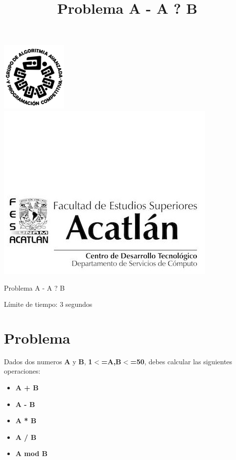 \documentclass[letter,10pt]{article}
\date{}
\begin{document}
\title{Problema A - A ? B}

\includegraphics[scale=0.6]{logo} \hspace*{9.00cm}
\includegraphics[scale=0.5]{dsc} 
\bigskip
\begin{center}
    \Large Problema A - A ? B
\end{center}

\begin{flushright}
Límite de tiempo: 3 segundos
\par\end{flushright}
\bigskip

\section*{Problema}

Dados dos numeros \textbf{A} y \textbf{B}, \textbf{1$<$=A,B$<$=50}, debes calcular las siguientes operaciones:

\begin{itemize}
\item \textbf{A + B}
\item \textbf{A - B}
\item \textbf{A * B}
\item \textbf{A / B}
\item \textbf{A mod B}
\end{itemize}
\end{document}
